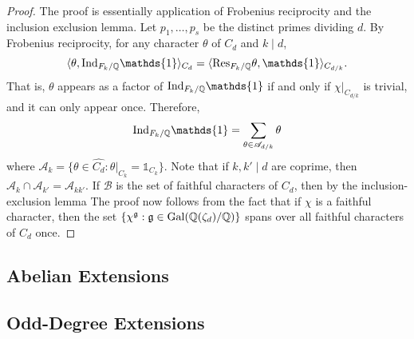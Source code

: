 \begin{proof}
    The proof is essentially application of Frobenius reciprocity and the inclusion exclusion lemma. Let $p_1,\ldots,p_s$ be the distinct primes dividing $d$. By Frobenius reciprocity, for any character $\theta$ of $C_d$ and $k\mid d$,
    $$\langle\theta,\Ind_{F_k/\QQ}\mathds{1}\rangle_{C_d}=\langle\Res_{F_k/\QQ}\theta,\mathds{1}\rangle_{C_{d/k}}.$$
    That is, $\theta$ appears as a factor of $\Ind_{F_k/\QQ}\mathds{1}$ if and only if $\chi|_{C_{d/k}}$ is trivial, and it can only appear once. Therefore,
    $$\Ind_{F_k/\QQ}\mathds{1}=\sum_{\theta\in\mathcal{A}_{d/k}}\theta$$
    where $\mathcal{A}_k=\{\theta\in\widehat{C_d}:\theta|_{C_{k}}=\mathds{1}_{C_{k}}\}$. Note that if $k,k'\mid d$ are coprime, then $\mathcal{A}_k\cap\mathcal{A}_{k'}=\mathcal{A}_{kk'}$. If $\mathcal{B}$ is the set of faithful characters of $C_d$, then by the inclusion-exclusion lemma
    The proof now follows from the fact that if $\chi$ is a faithful character, then the set $\{\chi^{\mathfrak{g}}:\mathfrak{g}\in\mathrm{Gal}(\mathbb{Q}(\zeta_d)/\mathbb{Q})\}$ spans over all faithful characters of $C_d$ once. 
\end{proof}


\subsection{Abelian Extensions}

\subsection{Odd-Degree Extensions}